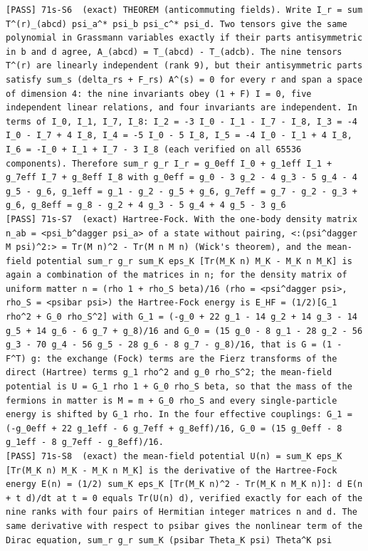 \documentclass[
  10pt,
]{article}
\begin{document}
\begin{verbatim}
[PASS] 71s-S6  (exact) THEOREM (anticommuting fields). Write I_r = sum T^(r)_(abcd) psi_a^* psi_b psi_c^* psi_d. Two tensors give the same polynomial in Grassmann variables exactly if their parts antisymmetric in b and d agree, A_(abcd) = T_(abcd) - T_(adcb). The nine tensors T^(r) are linearly independent (rank 9), but their antisymmetric parts satisfy sum_s (delta_rs + F_rs) A^(s) = 0 for every r and span a space of dimension 4: the nine invariants obey (1 + F) I = 0, five independent linear relations, and four invariants are independent. In terms of I_0, I_1, I_7, I_8: I_2 = -3 I_0 - I_1 - I_7 - I_8, I_3 = -4 I_0 - I_7 + 4 I_8, I_4 = -5 I_0 - 5 I_8, I_5 = -4 I_0 - I_1 + 4 I_8, I_6 = -I_0 + I_1 + I_7 - 3 I_8 (each verified on all 65536 components). Therefore sum_r g_r I_r = g_0eff I_0 + g_1eff I_1 + g_7eff I_7 + g_8eff I_8 with g_0eff = g_0 - 3 g_2 - 4 g_3 - 5 g_4 - 4 g_5 - g_6, g_1eff = g_1 - g_2 - g_5 + g_6, g_7eff = g_7 - g_2 - g_3 + g_6, g_8eff = g_8 - g_2 + 4 g_3 - 5 g_4 + 4 g_5 - 3 g_6
[PASS] 71s-S7  (exact) Hartree-Fock. With the one-body density matrix n_ab = <psi_b^dagger psi_a> of a state without pairing, <:(psi^dagger M psi)^2:> = Tr(M n)^2 - Tr(M n M n) (Wick's theorem), and the mean-field potential sum_r g_r sum_K eps_K [Tr(M_K n) M_K - M_K n M_K] is again a combination of the matrices in n; for the density matrix of uniform matter n = (rho 1 + rho_S beta)/16 (rho = <psi^dagger psi>, rho_S = <psibar psi>) the Hartree-Fock energy is E_HF = (1/2)[G_1 rho^2 + G_0 rho_S^2] with G_1 = (-g_0 + 22 g_1 - 14 g_2 + 14 g_3 - 14 g_5 + 14 g_6 - 6 g_7 + g_8)/16 and G_0 = (15 g_0 - 8 g_1 - 28 g_2 - 56 g_3 - 70 g_4 - 56 g_5 - 28 g_6 - 8 g_7 - g_8)/16, that is G = (1 - F^T) g: the exchange (Fock) terms are the Fierz transforms of the direct (Hartree) terms g_1 rho^2 and g_0 rho_S^2; the mean-field potential is U = G_1 rho 1 + G_0 rho_S beta, so that the mass of the fermions in matter is M = m + G_0 rho_S and every single-particle energy is shifted by G_1 rho. In the four effective couplings: G_1 = (-g_0eff + 22 g_1eff - 6 g_7eff + g_8eff)/16, G_0 = (15 g_0eff - 8 g_1eff - 8 g_7eff - g_8eff)/16.
[PASS] 71s-S8  (exact) the mean-field potential U(n) = sum_K eps_K [Tr(M_K n) M_K - M_K n M_K] is the derivative of the Hartree-Fock energy E(n) = (1/2) sum_K eps_K [Tr(M_K n)^2 - Tr(M_K n M_K n)]: d E(n + t d)/dt at t = 0 equals Tr(U(n) d), verified exactly for each of the nine ranks with four pairs of Hermitian integer matrices n and d. The same derivative with respect to psibar gives the nonlinear term of the Dirac equation, sum_r g_r sum_K (psibar Theta_K psi) Theta^K psi

\end{verbatim}
\end{document}
